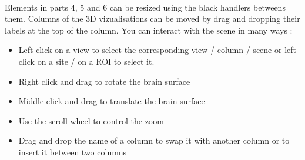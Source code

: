 \documentclass[a4paper]{article}
\begin{document}
\paragraph{} Elements in parts 4, 5 and 6 can be resized using the black handlers betweens them. Columns of the 3D vizualisations can be moved by drag and dropping their labels at the top of the column. You can interact with the scene in many ways :
\begin{itemize}
\item Left click on a view to select the corresponding view / column / scene or left click on a site / on a ROI to select it.
\item Right click and drag to rotate the brain surface
\item Middle click and drag to translate the brain surface
\item Use the scroll wheel to control the zoom
\item Drag and drop the name of a column to swap it with another column or to insert it between two columns
\end{itemize}
\end{document}

